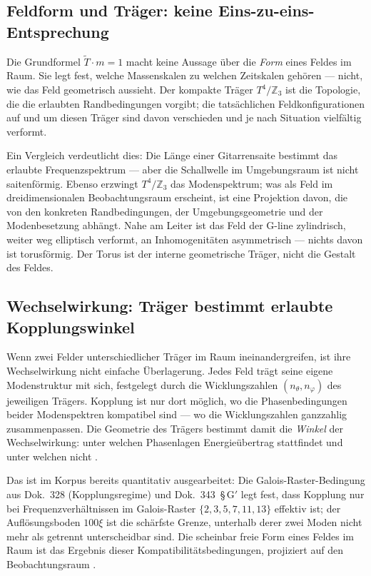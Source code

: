 \subsection*{Feldform und Träger: keine Eins-zu-eins-Entsprechung}

Die Grundformel $\tilde{T}\cdot m=1$ macht keine Aussage über die
\emph{Form} eines Feldes im Raum. Sie legt fest, welche Massenskalen
zu welchen Zeitskalen gehören --- nicht, wie das Feld geometrisch
aussieht. Der kompakte Träger $T^4/\mathbb{Z}_3$ ist die Topologie,
die die erlaubten Randbedingungen vorgibt; die tatsächlichen
Feldkonfigurationen auf und um diesen Träger sind davon verschieden
und je nach Situation vielfältig verformt.

Ein Vergleich verdeutlicht dies: Die Länge einer Gitarrensaite bestimmt
das erlaubte Frequenzspektrum --- aber die Schallwelle im Umgebungsraum
ist nicht saitenförmig. Ebenso erzwingt $T^4/\mathbb{Z}_3$ das
Modenspektrum; was als Feld im dreidimensionalen Beobachtungsraum
erscheint, ist eine Projektion davon, die von den konkreten
Randbedingungen, der Umgebungsgeometrie und der Modenbesetzung
abhängt. Nahe am Leiter ist das Feld der G-line zylindrisch, weiter
weg elliptisch verformt, an Inhomogenitäten asymmetrisch --- nichts
davon ist torusförmig. Der Torus ist der interne geometrische Träger,
nicht die Gestalt des Feldes.

\subsection*{Wechselwirkung: Träger bestimmt erlaubte Kopplungswinkel}

Wenn zwei Felder unterschiedlicher Träger im Raum ineinandergreifen,
ist ihre Wechselwirkung nicht einfache Überlagerung. Jedes Feld trägt
seine eigene Modenstruktur mit sich, festgelegt durch die
Wicklungszahlen $(n_\theta, n_\varphi)$ des jeweiligen Trägers.
Kopplung ist nur dort möglich, wo die Phasenbedingungen beider
Modenspektren kompatibel sind --- wo die Wicklungszahlen ganzzahlig
zusammenpassen. Die Geometrie des Trägers bestimmt damit die
\emph{Winkel} der Wechselwirkung: unter welchen Phasenlagen
Energieübertrag stattfindet und unter welchen nicht \SM.

Das ist im Korpus bereits quantitativ ausgearbeitet: Die
Galois-Raster-Bedingung aus Dok.~328 (Kopplungsregime) und
Dok.~343~\S\,G$'$ legt fest, dass Kopplung nur bei Frequenzverhältnissen
im Galois-Raster $\{2,3,5,7,11,13\}$ effektiv ist; der Auflösungsboden
$100\xi$ ist die schärfste Grenze, unterhalb derer zwei Moden nicht
mehr als getrennt unterscheidbar sind. Die scheinbar freie Form
eines Feldes im Raum ist das Ergebnis dieser Kom\-pa\-ti\-bi\-li\-täts\-be\-din\-gun\-gen,
projiziert auf den Beobachtungsraum \SM.

